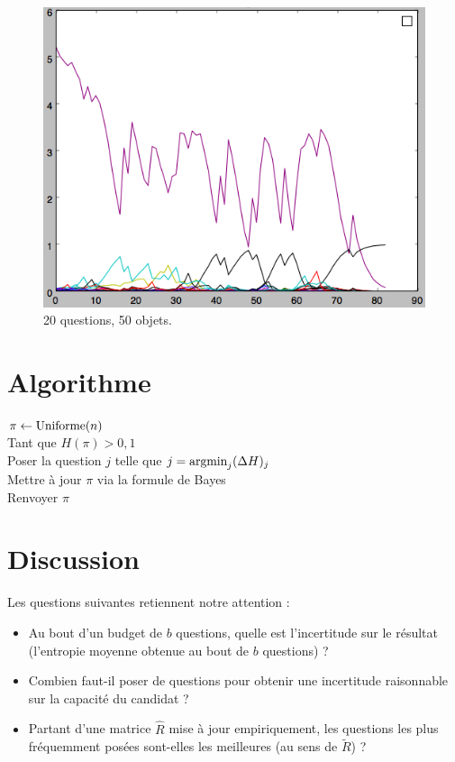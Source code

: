 \documentclass[a4paper,12pt]{article}
\begin{document}
\begin{figure}
\includegraphics[width=\linewidth]{game.png}
\caption{20 questions, 50 objets.}
\end{figure}

\section{Algorithme}

\noindent
$\pi \leftarrow \textnormal{Uniforme}(n)$\\
Tant que $H(\pi) > 0,1$\\
\indent Poser la question $j$ telle que $j = \textnormal{argmin}_j (\Delta H)_j$\\
\indent Mettre à jour $\pi$ via la formule de Bayes\\
Renvoyer $\pi$

\section{Discussion}

Les questions suivantes retiennent notre attention :
\begin{itemize}
\item Au bout d'un budget de $b$ questions, quelle est l'incertitude sur le résultat (l'entropie moyenne obtenue au bout de $b$ questions) ?
\item Combien faut-il poser de questions pour obtenir une incertitude raisonnable sur la capacité du candidat ?
\item Partant d'une matrice $\widehat{R}$ mise à jour empiriquement, les questions les plus fréquemment posées sont-elles les meilleures (au sens de $\tilde{R}$) ?
\end{itemize}
\end{document}
